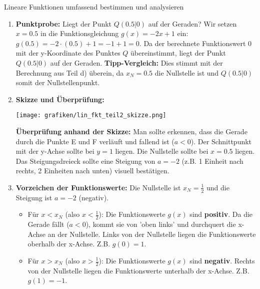 \begin{loesungsumgebung}{Lineare Funktionen umfassend bestimmen und analysieren}
\begin{enumerate}[label=(\alph*)]
    \item \textbf{Punktprobe:} Liegt der Punkt $Q(0.5|0)$ auf der Geraden?
    Wir setzen $x=0.5$ in die Funktionsgleichung $g(x) = -2x+1$ ein:
    $g(0.5) = -2 \cdot (0.5) + 1 = -1 + 1 = 0$.
    Da der berechnete Funktionswert $0$ mit der y-Koordinate des Punktes $Q$ übereinstimmt, liegt der Punkt $Q(0.5|0)$ auf der Geraden.
    \textbf{Tipp-Vergleich:} Dies stimmt mit der Berechnung aus Teil d) überein, da $x_N=0.5$ die Nullstelle ist und $Q(0.5|0)$ somit der Nullstellenpunkt.

    \item \textbf{Skizze und Überprüfung:}
    \begin{center}
    \texttt{[image: grafiken/lin\_fkt\_teil2\_skizze.png]}
    \label{fig:lin_fkt_teil2}
    \end{center}
    \textbf{Überprüfung anhand der Skizze:} Man sollte erkennen, dass die Gerade durch die Punkte E und F verläuft und fallend ist ($a<0$). Der Schnittpunkt mit der y-Achse sollte bei $y=1$ liegen. Die Nullstelle sollte bei $x=0.5$ liegen. Das Steigungsdreieck sollte eine Steigung von $a=-2$ (z.B. 1 Einheit nach rechts, 2 Einheiten nach unten) visuell bestätigen.

    \item \textbf{Vorzeichen der Funktionswerte:}
    Die Nullstelle ist $x_N = \frac{1}{2}$ und die Steigung ist $a=-2$ (negativ).
    \begin{itemize}
        \item Für $x < x_N$ (also $x < \frac{1}{2}$): Die Funktionswerte $g(x)$ sind \textbf{positiv}. Da die Gerade fällt ($a<0$), kommt sie von 'oben links' und durchquert die x-Achse an der Nullstelle. Links von der Nullstelle liegen die Funktionswerte oberhalb der x-Achse. Z.B. $g(0) = 1$.
        \item Für $x > x_N$ (also $x > \frac{1}{2}$): Die Funktionswerte $g(x)$ sind \textbf{negativ}. Rechts von der Nullstelle liegen die Funktionswerte unterhalb der x-Achse. Z.B. $g(1) = -1$.
    \end{itemize}
\end{enumerate}

\end{loesungsumgebung}

